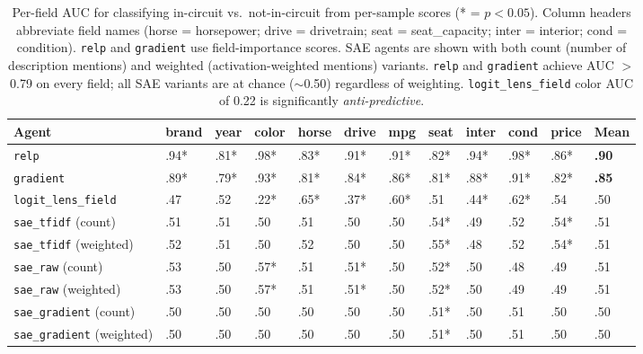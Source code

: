 \documentclass{article} %
\begin{document}
\begin{table}[h]
\footnotesize\centering
\setlength{\tabcolsep}{3.5pt}
\begin{tabular}{@{}l llllllllll l@{}}
\toprule
\textbf{Agent} & \textbf{brand} & \textbf{year} & \textbf{color} & \textbf{horse} & \textbf{drive} & \textbf{mpg} & \textbf{seat} & \textbf{inter} & \textbf{cond} & \textbf{price} & \textbf{Mean} \\
\midrule
\rowcolor{gradrow} \texttt{relp} & .94* & .81* & .98* & .83* & .91* & .91* & .82* & .94* & .98* & .86* & \textbf{.90} \\
\rowcolor{gradrow} \texttt{gradient} & .89* & .79* & .93* & .81* & .84* & .86* & .81* & .88* & .91* & .82* & \textbf{.85} \\
\midrule
\texttt{logit\_lens\_field} & .47 & .52 & .22* & .65* & .37* & .60* & .51 & .44* & .62* & .54 & .50 \\
\midrule
\texttt{sae\_tfidf} (count) & .51 & .51 & .50 & .51 & .50 & .50 & .54* & .49 & .52 & .54* & .51 \\
\texttt{sae\_tfidf} (weighted) & .52 & .51 & .50 & .52 & .50 & .50 & .55* & .48 & .52 & .54* & .51 \\
\texttt{sae\_raw} (count) & .53 & .50 & .57* & .51 & .51* & .50 & .52* & .50 & .48 & .49 & .51 \\
\texttt{sae\_raw} (weighted) & .53 & .50 & .57* & .51 & .51* & .50 & .52* & .50 & .49 & .49 & .51 \\
\texttt{sae\_gradient} (count) & .50 & .50 & .50 & .50 & .50 & .50 & .51* & .50 & .51 & .50 & .50 \\
\texttt{sae\_gradient} (weighted) & .50 & .50 & .50 & .50 & .50 & .50 & .51* & .50 & .51 & .50 & .50 \\
\bottomrule
\end{tabular}
\caption{Per-field AUC for classifying in-circuit vs.\ not-in-circuit from per-sample scores (* = $p < 0.05$). Column headers abbreviate field names (horse = horsepower; drive = drivetrain; seat = seat\_capacity; inter = interior; cond = condition). \texttt{relp} and \texttt{gradient} use field-importance scores. SAE agents are shown with both count (number of description mentions) and weighted (activation-weighted mentions) variants. \texttt{relp} and \texttt{gradient} achieve AUC $>$ 0.79 on every field; all SAE variants are at chance (${\sim}$0.50) regardless of weighting. \texttt{logit\_lens\_field} color AUC of 0.22 is significantly \emph{anti-predictive}.}
\label{tab:perfield_auc}
\end{table}
\end{document}
